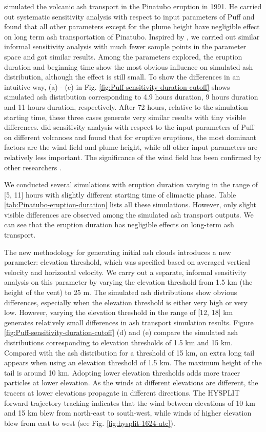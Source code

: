 \documentclass[utf8]{frontiersSCNS} %
\begin{document}
\citet{fero2008simulation} simulated the volcanic ash transport in the Pinatubo eruption in 1991. He carried out systematic sensitivity analysis with respect to input parameters of Puff and found that all other parameters except for the plume height have negligible effect on long term ash transportation of Pinatubo. Inspired by \citet{fero2008simulation}, we carried out similar informal sensitivity analysis with much fewer sample points in the parameter space and got similar results. Among the parameters explored, the eruption duration and beginning time show the most obvious influence on simulated ash distribution, although the effect is still small. To show the differences in an intuitive way, (a) - (c) in Fig. \ref{fig:Puff-sensitivity-duration-cutoff} shows simulated ash distribution corresponding to 4.9 hours duration, 9 hours duration and 11 hours duration, respectively. After 72 hours, relative to the simulation starting time, these three cases generate very similar results with tiny visible differences. \citet{daniele2009applications} did sensitivity analysis with respect to the input parameters of Puff on different volcanoes and found that for eruptive eruptions, the most dominant factors are the wind field and plume height, while all other input parameters are relatively less important. The significance of the wind field has been confirmed by other researchers \citep[e.g]{stefanescu2014fast}.

We conducted several simulations with eruption duration varying in the range of [5, 11] hours with slightly different starting time of climactic phase. Table \ref{tab:Pinatubo-eruption-duration} lists all these simulations. However, only slight visible differences are observed among the simulated ash transport outputs. We can see that the eruption duration has negligible effects on long-term ash transport.

The new methodology for generating initial ash clouds introduces a new parameter: elevation threshold, which was specified based on averaged vertical velocity and horizontal velocity. We carry out a separate, informal sensitivity analysis on this parameter by varying the elevation threshold from 1.5 km (the height of the vent) to 25 m. The simulated ash distributions show obvious differences, especially when the elevation threshold is either very high or very low. However, varying the elevation threshold in the range of [12, 18] km generates relatively small differences in ash transport simulation results.  Figure \ref{fig:Puff-sensitivity-duration-cutoff} (d) and (e) compare the simulated ash distributions corresponding to elevation thresholds of 1.5 km and 15 km. Compared with the ash distribution for a threshold of 15 km, an extra long tail appears when using an elevation threshold of 1.5 km. The maximum height of the tail is around 10 km. Adopting lower elevation thresholds adds more tracer particles at lower elevation. As the winds at different elevations are different, the tracers at lower elevations propagate in different directions. The HYSPLIT forward trajectory tracking indicates that the wind between elevations of 10 km and 15 km blew from north-east to south-west, while winds of higher elevation blew from east to west (see Fig. \ref{fig:hysplit-1624-utc}).
\end{document}

